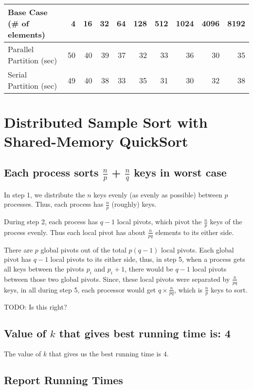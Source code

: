 \documentclass{article}
\begin{document}
\begin{center}
  \begin{tabular}{| l | r | r | r | r | r | r | r | r | r |}
    \hline
    Base Case (\# of elements) & 4 & 16 & 32 & 64 & 128 & 512 & 1024 & 4096 & 8192 \\ \hline
    Parallel Partition (sec) & 50 & 40 & 39 & 37 & 32 & 33 & 36 & 30 & 35 \\ \hline
    Serial Partition (sec) & 49 & 40 & 38 & 33 & 35 & 31 & 30 & 32 & 38 \\ \hline
  \end{tabular}
\end{center}


\section{Distributed Sample Sort with Shared-Memory QuickSort}

\subsection{Each process sorts $\frac{n}{p}$ + $\frac{n}{q}$ keys in worst case}
In step 1, we distribute the $n$ keys evenly (as evenly as possible)
between $p$ processes. Thus, each process has $\frac{n}{p}$ (roughly) keys.

During step 2, each process has $q-1$ local pivots, which pivot the 
$\frac{n}{p}$ keys of the process evenly. Thus each local pivot has 
about $\frac{n}{pq}$ elements to its either side. 

There are $p$ global pivots out of the total $p(q-1)$ local pivots.
Each global pivot has $q-1$ local pivots to its either side, thus, 
in step 5, when a process gets all keys between the pivots $p_i$ and 
$p_i+1$, there would be $q-1$ local pivots between those two global
pivots. Since, these local pivots were separated by 
$\frac{n}{pq}$ keys, in all during step 5, each processor would get
$q \times \frac{n}{pq}$, which is $\frac{n}{p}$ keys to sort.

TODO: Is this right?

\subsection{Value of $k$ that gives best running time is: 4}

The value of $k$ that gives us the best running time is $4$.

\subsection{Report Running Times}
\end{document}
